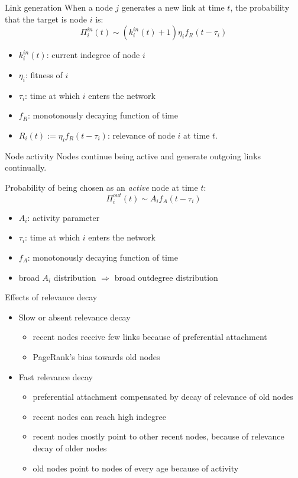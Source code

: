 \documentclass[utf8]{beamer}
\begin{document}
\begin{frame}{Link generation}
    When a node $j$ generates a new link at time $t$, the probability that the target is node $i$ is:
    \[
        \Pi_i^{in}(t) \sim (k_i^{in}(t) + 1)\eta_i f_R (t-\tau_i)
    \]
    \begin{itemize}
        \item $k_i^{in}(t)$: current indegree of node $i$
        \item $\eta_i$: fitness of $i$
        \item $\tau_i$: time at which $i$ enters the network
        \item $f_R$: monotonously decaying function of time
        \item $R_i(t) := \eta_i f_R (t-\tau_i)$: \alert{relevance} of node $i$ at time $t$.
    \end{itemize}
\end{frame}

\begin{frame}{Node activity}
    Nodes continue being active and generate outgoing links continually.

    Probability of being chosen as an \emph{active} node at time $t$:
    \[
        \Pi_i^{out}(t) \sim A_i f_A (t-\tau_i)
    \]
    \begin{itemize}
        \item $A_i$: activity parameter
        \item $\tau_i$: time at which $i$ enters the network
        \item $f_A$: monotonously decaying function of time
        \item broad $A_i$ distribution $\Longrightarrow$ broad outdegree distribution
    \end{itemize}
\end{frame}

\begin{frame}{Effects of relevance decay}
\begin{itemize}
    \item \alert{Slow} or absent relevance decay
    \begin{itemize}
        \item recent nodes receive few links because of preferential attachment
        \item PageRank's bias towards old nodes
    \end{itemize}
    \item \alert{Fast} relevance decay
    \begin{itemize}
        \item preferential attachment compensated by decay of relevance of old nodes
        \item recent nodes can reach high indegree
        \item recent nodes mostly point to other recent nodes, because of relevance decay of older nodes
        \item old nodes point to nodes of every age because of activity
    \end{itemize}
\end{itemize}
\end{frame}
\end{document}
